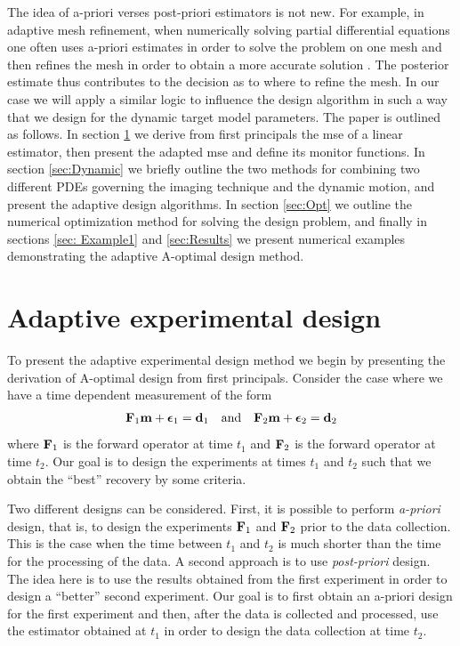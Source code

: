 \documentclass[11pt]{article}
\newcommand{\bfF}	{{\bf{F}}}
\newcommand{\bfd}	{{\bf{d}}}
\newcommand{\bfm}	{{\bf{m}}}
\newcommand{\bfepsilon} {{\boldsymbol \epsilon}}
\begin{document}
The idea of a-priori verses post-priori  estimators is not new. For example, in adaptive mesh refinement, when numerically 
solving partial differential
equations one often uses a-priori estimates in order to solve the problem on one mesh 
and then refines the mesh in order to obtain a more accurate solution \cite{MultiGrid}. The posterior estimate thus contributes to the decision as to where to refine the mesh. In our case we will apply a similar logic to influence the design algorithm in such a way that we design for the dynamic target model parameters. 
\bigskip
The paper is outlined as follows. In section \ref{sec: Adaptive} we derive from first principals the mse of a linear estimator, then present the adapted mse and define its monitor functions. In section \ref{sec:Dynamic} we briefly outline the two methods for combining two different PDEs governing the imaging technique and the dynamic motion, and present the adaptive design algorithms.  
In section \ref{sec:Opt} we outline the numerical optimization method for solving the design problem, and finally in sections \ref{sec: Example1} and \ref{sec:Results} we present  numerical examples demonstrating the adaptive A-optimal design method. 




\section{ Adaptive experimental design }
\label{sec: Adaptive}
To present the adaptive experimental design method we begin by presenting the derivation of A-optimal design from first principals. Consider the case where we have a time dependent measurement of the form
\begin{eqnarray}
\label{data}
\bfF_{1} \bfm + \bfepsilon_1 = \bfd_{1}\quad {\rm and} \quad \bfF_{2} \bfm + \bfepsilon_2 = \bfd_{2}
\end{eqnarray}
where $\bfF_{1}$ is the forward operator at time $t_{1}$ and $\bfF_{2}$ is the forward operator 
at time $t_{2}$.
Our goal is to design the experiments at times $t_{1}$ and $t_{2}$ such that we obtain the ``best''
recovery by some criteria.

Two different designs can be considered. First, it is possible to perform {\em a-priori} design, that is,
to design the experiments $\bfF_{1}$ and $\bfF_{2}$ prior to the data collection. This is the case
when the time between $t_{1}$ and $t_{2}$ is much shorter than the time for the processing
of the data. A second approach is to use {\em post-priori} design. The idea here is to use the 
results obtained from the first experiment in order to design a ``better'' second experiment.
Our goal is to first obtain an a-priori design for the first experiment
and then, after the data is collected and processed, use the estimator
obtained at $t_{1}$ in order  to design the data collection
at time $t_{2}$.
\end{document}
